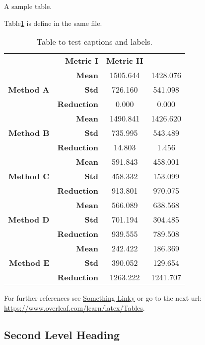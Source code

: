 \begin{table}[h!]
\scriptsize
\renewcommand{\tabcolsep}{0.09cm}
\centering

\caption{A sample table.}
\label{table:test}
\end{table}

Table\ref{table:test2} is define in the same file. 


\begin{table}[h!]
\centering
\begin{tabular}{rrcc}
\addlinespace
\toprule
\multicolumn{ 2}{c}{{\bf Condition}} & {\bf Metric I} & {\bf Metric II} \\
\otoprule
{\bf } & {\bf Mean} & 1505.644 & 1428.076 \\
{\bf Method A} & {\bf Std} & 726.160 & 541.098 \\
{\bf } & {\bf Reduction} & 0.000 & 0.000 \\
\midrule
{\bf } & {\bf Mean} & 1490.841 & 1426.620 \\
{\bf Method B} & {\bf Std} & 735.995 & 543.489 \\
{\bf } & {\bf Reduction} & 14.803 & 1.456 \\
\midrule
{\bf } & {\bf Mean} & 591.843 & 458.001 \\
{\bf Method C} & {\bf Std} & 458.332 & 153.099 \\
{\bf } & {\bf Reduction} & 913.801 & 970.075 \\
\midrule
{\bf } & {\bf Mean} & 566.089 & 638.568 \\
{\bf Method D} & {\bf Std} & 701.194 & 304.485 \\
{\bf } & {\bf Reduction} & 939.555 & 789.508 \\
\midrule
{\bf } & {\bf Mean} & 242.422 & 186.369 \\
{\bf Method E} & {\bf Std} & 390.052 & 129.654 \\
      & {\bf Reduction} & 1263.222 & 1241.707 \\
\midrule
\end{tabular}
\caption{Table to test captions and labels.}
\label{table:test2}
\end{table}

For further references see \href{https://www.overleaf.com/learn/latex/Tables}{Something 
Linky} or go to the next url: \url{https://www.overleaf.com/learn/latex/Tables}.

\subsection{Second Level Heading}
